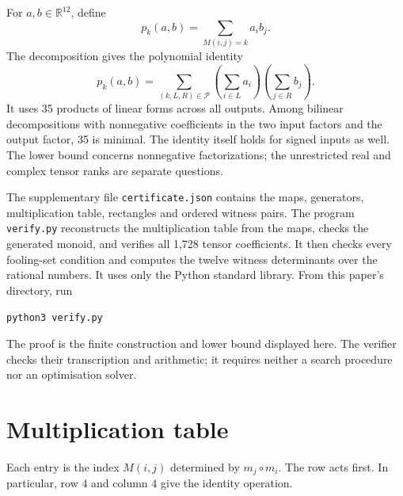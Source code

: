 \documentclass[11pt,a4paper]{article}
\theoremstyle{definition}
\newcommand{\R}{\mathbb R}
\begin{document}
For $a,b\in\R^{12}$, define
\[
 p_k(a,b)=\sum_{M(i,j)=k}a_i b_j.
\]
The decomposition gives the polynomial identity
\begin{equation}\label{eq:bilinear}
 p_k(a,b)=\sum_{(k,L,R)\in\mathcal P}
       \left(\sum_{i\in L}a_i\right)
       \left(\sum_{j\in R}b_j\right).
\end{equation}
It uses 35 products of linear forms across all outputs. Among bilinear
decompositions with nonnegative coefficients in the two input factors
and the output factor, 35 is minimal. The identity itself holds for
signed inputs as well. The lower bound concerns nonnegative
factorizations; the unrestricted real and complex tensor ranks are
separate questions.

The supplementary file \texttt{certificate.json} contains the maps,
generators, multiplication table, rectangles and ordered witness pairs.
The program \texttt{verify.py} reconstructs the multiplication table from
the maps, checks the generated monoid, and verifies all 1,728 tensor
coefficients. It then checks every fooling-set condition and computes
the twelve witness determinants over the rational numbers. It uses
only the Python standard library. From this paper's directory, run
\begin{verbatim}
python3 verify.py
\end{verbatim}
The proof is the finite construction and lower bound displayed here.
The verifier checks their transcription and arithmetic; it requires
neither a search procedure nor an optimisation solver.

\appendix
\clearpage
\section{Multiplication table}\label{app:table}

Each entry is the index $M(i,j)$ determined by $m_j\circ m_i$.
The row acts first. In particular, row $4$ and column $4$ give the
identity operation.
\end{document}
